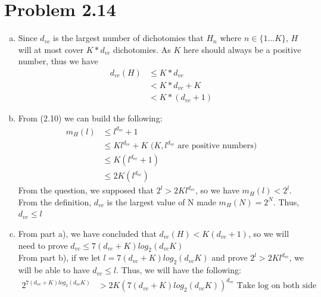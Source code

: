 \documentclass{article}
\def\math#1{$#1$}
\begin{document}
\section{Problem 2.14}

\begin{enumerate}[a)]
    \item Since \math{d_{vc}} is the largest number of dichotomies that \math{H_n} where \math{n \in \{1...K\}}, \math{H} will at most cover \math{K * d_{vc}} dichotomies. As \math{K} here should always be a positive number, thus we have 
        \begin{equation}
            \begin{split}
                d_{vc}(H) & \leq K * d_{vc} \\
                &< K * d_{vc} + K \\
                &< K * (d_{vc} + 1)
            \end{split}
        \end{equation}
    \item From (2.10) we can build the following:
        \begin{equation}
            \begin{split}
                m_H(l) &\leq l^{d_{vc}} + 1 \\
                &\leq K l^{d_{vc}} + K \text{ (} K, l^{d_{vc}} \text{ are positive numbers)} \\ 
                &\leq K(l^{d_{vc}} + 1) \\
                &\leq 2K(l^{d_{vc}})
            \end{split}
        \end{equation}
        From the question, we supposed that \math{2^l > 2Kl^{d_{vc}}}, so we have \math{m_H(l) < 2^l}. From the definition, \math{d_{vc}} is the largest value of N made \math{m_H(N) = 2^N}. Thus, \math{d_{vc} \leq l}
    \item From part a), we have concluded that \math{d_{vc}(H) < K(d_{vc} + 1)}, so we will need to prove \math{d_{vc} \leq 7(d_{vc} + K)log_2(d_{vc}K) } \\
    From part b), if we let \math{l = 7(d_{vc} + K)log_2(d_{vc}K)} and prove \math{2^l > 2Kl^{d_{vc}}}, we will be able to have \math{d_{vc} \leq l}. Thus, we will have the following:
    \begin{equation}
        \begin{split}
             2^{7(d_{vc} + K)log_2(d_{vc}K)} &> 2K{(7(d_{vc} + K)log_2(d_{vc}K))}^{d_{vc}} \text{  Take log on both side } \\

\end{split}
\end{equation}
\end{enumerate}
\end{document}
